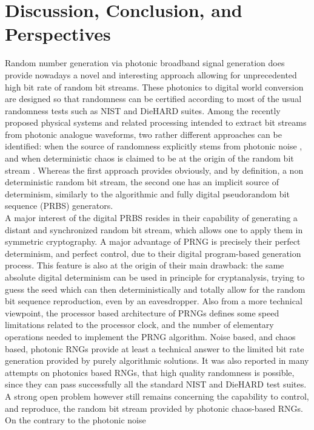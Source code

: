 \section{Discussion, Conclusion, and Perspectives}
\label{conclusion}
Random number generation via photonic broadband signal generation does
provide nowadays a novel and interesting approach allowing for
unprecedented high bit rate of random bit streams. These photonics to
digital world conversion are designed so that randomness can be
certified according to most of the usual randomness tests such as NIST
and DieHARD suites. Among the recently proposed physical systems and
related processing intended to extract bit streams from photonic
analogue waveforms, two rather different approaches can be identified:
when the source of randomness explicitly stems from photonic noise
\cite{li:OL11,wetzel:ox12}, and when deterministic chaos is claimed to
be at the origin of the random bit stream
\cite{fast,ultrafast2009}. Whereas the first approach provides
obviously, and by definition, a non deterministic random bit stream,
the second one has an implicit source of determinism, similarly to the
algorithmic and fully digital pseudorandom bit sequence (PRBS)
generators.\\ A major interest of the digital PRBS resides in their
capability of generating a distant and synchronized random bit stream,
which allows one to apply them in symmetric cryptography. A major
advantage of PRNG is precisely their perfect determinism, and perfect
control, due to their digital program-based generation process. This
feature is also at the origin of their main drawback: the same
absolute digital determinism can be used in principle for
cryptanalysis, trying to guess the seed which can then
deterministically and totally allow for the random bit sequence
reproduction, even by an eavesdropper. Also from a more technical
viewpoint, the processor based architecture of PRNGs defines some
speed limitations related to the processor clock, and the number of
elementary operations needed to implement the PRNG algorithm. Noise
based, and chaos based, photonic RNGs provide at least a technical
answer to the limited bit rate generation provided by purely
algorithmic solutions. It was also reported in many attempts on
photonics based RNGs, that high quality randomness is possible, since
they can pass successfully all the standard NIST and DieHARD test
suites. A strong open problem however still remains concerning the
capability to control, and reproduce, the random bit stream provided
by photonic chaos-based RNGs. On the contrary to the photonic noise
